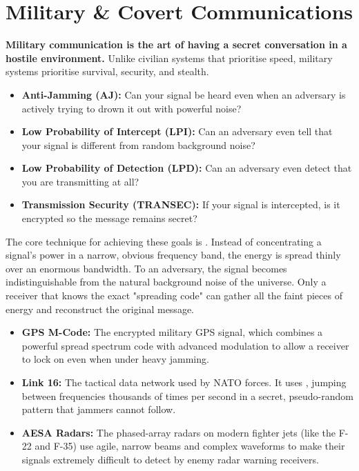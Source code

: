
\chapter{Military \& Covert Communications}
\label{ch:military-covert}

\begin{nontechnical}
    \textbf{Military communication is the art of having a secret conversation in a hostile environment.} Unlike civilian systems that prioritise speed, military systems prioritise survival, security, and stealth.

    \begin{itemize}
        \item \textbf{Anti-Jamming (AJ):} Can your signal be heard even when an adversary is actively trying to drown it out with powerful noise?
        \item \textbf{Low Probability of Intercept (LPI):} Can an adversary even tell that your signal is different from random background noise?
        \item \textbf{Low Probability of Detection (LPD):} Can an adversary even detect that you are transmitting at all?
        \item \textbf{Transmission Security (TRANSEC):} If your signal is intercepted, is it encrypted so the message remains secret?
    \end{itemize}

    The core technique for achieving these goals is . Instead of concentrating a signal's power in a narrow, obvious frequency band, the energy is spread thinly over an enormous bandwidth. To an adversary, the signal becomes indistinguishable from the natural background noise of the universe. Only a receiver that knows the exact "spreading code" can gather all the faint pieces of energy and reconstruct the original message.

    \begin{itemize}
        \item \textbf{GPS M-Code:} The encrypted military GPS signal, which combines a powerful spread spectrum code with advanced modulation to allow a receiver to lock on even when under heavy jamming.
        \item \textbf{Link 16:} The tactical data network used by NATO forces. It uses , jumping between frequencies thousands of times per second in a secret, pseudo-random pattern that jammers cannot follow.
        \item \textbf{AESA Radars:} The phased-array radars on modern fighter jets (like the F-22 and F-35) use agile, narrow beams and complex waveforms to make their signals extremely difficult to detect by enemy radar warning receivers.
    \end{itemize}
\end{nontechnical}


